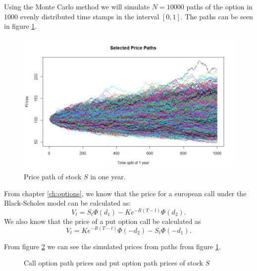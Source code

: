 \documentclass[a4paper, 12pt]{article}
\theoremstyle{definition}
\theoremstyle{plain}
\theoremstyle{definition}
\begin{document}
Using the Monte Carlo method we will simulate 
$N = 10000$ paths of the option in 1000 evenly 
distributed time stamps in the interval $[0,1]$.
The paths can be seen in 
figure \ref{fig:price_path}.

\begin{figure}[!ht]
    \centering
    \caption{Price path of stock $S$ in one year.}
    \label{fig:price_path}
    \includegraphics[scale=0.65]{price_paths.png}
 \end{figure}
 
From chapter \ref{ch:options}, we know 
that the price for a european call under the Black-Scholes model
can be calculated as:
$$
    V_t = S_t\Phi(d_1) - Ke^{-R(T-t)}\Phi(d_2).
$$
We also know that the price of a put option call be calculated as
$$
    V_t = Ke^{-R(T-t)}\Phi(-d_2)-S_t\Phi(-d_1).
$$    

From figure \ref{fig:option_prices} we can see 
the simulated prices from paths from figure \ref{fig:price_path}. 

\begin{figure}[ht!]
    \centering

    \caption{Call option path prices 
            and put option path prices of stock $S$}
 \label{fig:option_prices}
 \end{figure}
 
\end{document}

